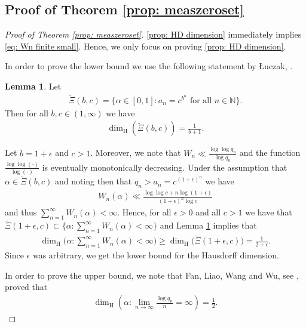 \documentclass[11pt]{amsart}
\theoremstyle{definition}
\newtheorem{lemma}[definition]{Lemma}
\numberwithin{equation}{section}
\begin{document}
\subsection{Proof of Theorem \ref{prop: measzeroset}}
\begin{proof}[Proof of Theorem \ref{prop: measzeroset}] 
\eqref{prop: HD dimension} immediately implies \eqref{eq: Wn finite small}. Hence, we only focus on proving \eqref{prop: HD dimension}.





In order to prove the lower bound we use the following statement by {\L}uczak, \cite{luczak}.
\begin{lemma}\label{lem: luczak}
Let 
\begin{align*}
 \widetilde{\Xi}(b,c)=\{\alpha\in [0,1]:a_n =c^{b^n}\text{ for all }n\in\mathbb{N}\}.
\end{align*}
Then for all $b,c\in (1,\infty)$ we have 
\begin{align*}
 \dim_{\mathrm{H}}(\widetilde{\Xi}(b,c))
 =\frac{1}{b+1}.
\end{align*}
\end{lemma}



Let $b=1+\epsilon$ and $c>1$. Moreover, we note that $W_n\ll \frac{\log\log q_n}{\log q_n}$ and the function $\frac{\log\log(\cdot)}{\log(\cdot)}$ is eventually monotonically decreasing. 
Under the assumption that $\alpha\in \widetilde{\Xi}(b,c)$ and noting then that $q_n> a_n= c^{(1+\epsilon)^n}$ we have
\begin{align*}
 W_n(\alpha)\ll \frac{\log\log c+ n\log (1+\epsilon) }{(1+\epsilon)^n\log c}
\end{align*}
and thus $\sum_{n=1}^{\infty}W_n(\alpha)<\infty$. 
Hence, for all $\epsilon>0$ and all $c>1$ we have that 
$ \widetilde{\Xi}(1+\epsilon, c)\subset \{\alpha: \sum_{n=1}^{\infty} W_n(\alpha)<\infty\}$ and
Lemma \ref{lem: luczak} implies that 
\begin{align*}
 \dim_{\mathrm{H}}\Big(\alpha: \sum_{n=1}^{\infty} W_n(\alpha)<\infty\Big)\geq \dim_{\mathrm{H}}\big(\widetilde{\Xi}(1+\epsilon, c)\big)= \frac{1}{2+\epsilon}.
\end{align*}
Since $\epsilon$ was arbitrary, we get the lower bound for the Hausdorff dimension.


In order to prove the upper bound, we note that Fan, Liao, Wang and Wu, see \cite[Theorem 1.2.\ (1)]{fanliauwangwu}, proved that
\begin{align}
 \dim_{\mathrm{H}}\left(\alpha: \lim_{n\to\infty}\frac{\log q_n}{n}=\infty\right)=\frac{1}{2}. \label{eq: dimH upper}
\end{align}




\end{proof}
\end{document}
